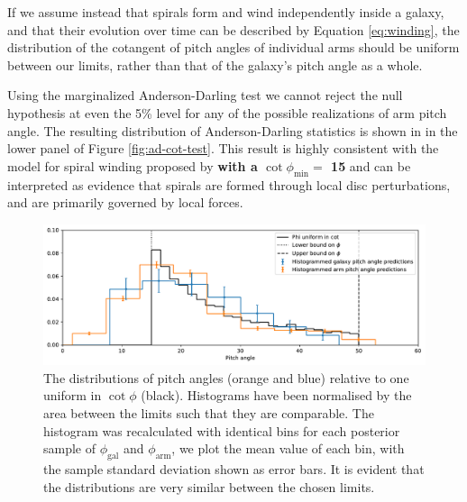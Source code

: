If we assume instead that spirals form and wind independently inside a galaxy, and that their evolution over time can be described by Equation \ref{eq:winding}, the distribution of the cotangent of pitch angles of individual arms should be uniform between our limits, rather than that of the galaxy's pitch angle as a whole.

Using the marginalized Anderson-Darling test we cannot reject the null hypothesis at even the 5\% level for any of the possible realizations of arm pitch angle. The resulting distribution of Anderson-Darling statistics is shown in in the lower panel of Figure \ref{fig:ad-cot-test}. This result is highly consistent with the model for spiral winding proposed by \citet{2019arXiv190910291P} {\bf with a $\cot{\phi_\mathrm{min}} = $ {15\degree} } and can be interpreted as evidence that spirals are formed through local disc perturbations, and are primarily governed by local forces.

\begin{figure}
  \includegraphics[width=17.7cm]{plots/phi_distribution_comparison.pdf}
  \caption{The distributions of pitch angles (orange and blue) relative to one uniform in $\cot\phi$ (black). Histograms have been normalised by the area between the limits such that they are comparable. The histogram was recalculated with identical bins for each posterior sample of $\phi_\mathrm{gal}$ and $\phi_\mathrm{arm}$, we plot the mean value of each bin, with the sample standard deviation shown as error bars. It is evident that the distributions are very similar between the chosen limits.}
  \label{fig:pa-cot-distributions}
\end{figure}


